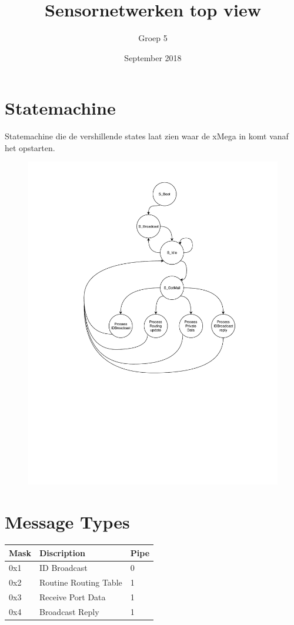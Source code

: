 \documentclass{article}
\title{Sensornetwerken top view}
\author{Groep 5}
\date{September 2018}
\begin{document}
\maketitle
\clearpage
{}
\clearpage

\section*{Statemachine}
Statemachine die de vershillende states laat zien waar de xMega in komt vanaf het opstarten.
\begin{figure}[h]
	\includegraphics[width=.8\textwidth, keepaspectratio]{media/Pstate.pdf}
    \caption{}
\end{figure}
\newpage

\section*{Message Types}
\begin{table}[h]
\begin{tabular}{|l|l|l|}
\hline
\rowcolor[HTML]{EFEFEF} 
Mask & Discription           & Pipe \\ \hline
0x1  & ID Broadcast          & 0    \\ \hline
0x2  & Routine Routing Table & 1    \\ \hline
0x3  & Receive Port Data     & 1    \\ \hline
0x4  & Broadcast Reply       & 1    \\ \hline
\end{tabular}
\end{table}
\end{document}
